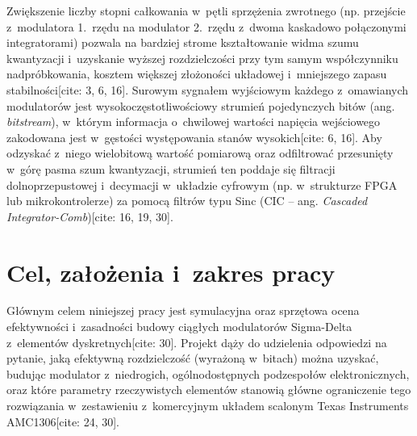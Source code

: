 Zwiększenie liczby stopni całkowania w~pętli sprzężenia zwrotnego (np. przejście z~modulatora 1.~rzędu na modulator 2.~rzędu z~dwoma kaskadowo połączonymi integratorami) pozwala na bardziej strome kształtowanie widma szumu kwantyzacji i~uzyskanie wyższej rozdzielczości przy tym samym współczynniku nadpróbkowania, kosztem większej złożoności układowej i~mniejszego zapasu stabilności[cite: 3, 6, 16]. Surowym sygnałem wyjściowym każdego z~omawianych modulatorów jest wysokoczęstotliwościowy strumień pojedynczych bitów (ang. \textit{bitstream}), w~którym informacja o~chwilowej wartości napięcia wejściowego zakodowana jest w~gęstości występowania stanów wysokich[cite: 6, 16]. Aby odzyskać z~niego wielobitową wartość pomiarową oraz odfiltrować przesunięty w~górę pasma szum kwantyzacji, strumień ten poddaje się filtracji dolnoprzepustowej i~decymacji w~układzie cyfrowym (np. w~strukturze FPGA lub mikrokontrolerze) za pomocą filtrów typu Sinc (CIC -- ang. \textit{Cascaded Integrator-Comb})[cite: 16, 19, 30].

\section{Cel, założenia i~zakres pracy}
\label{sec:cel_pracy}

Głównym celem niniejszej pracy jest symulacyjna oraz sprzętowa ocena efektywności i~zasadności budowy ciągłych modulatorów Sigma-Delta z~elementów dyskretnych[cite: 30]. Projekt dąży do udzielenia odpowiedzi na pytanie, jaką efektywną rozdzielczość (wyrażoną w~bitach) można uzyskać, budując modulator z~niedrogich, ogólnodostępnych podzespołów elektronicznych, oraz które parametry rzeczywistych elementów stanowią główne ograniczenie tego rozwiązania w~zestawieniu z~komercyjnym układem scalonym Texas Instruments AMC1306[cite: 24, 30].

